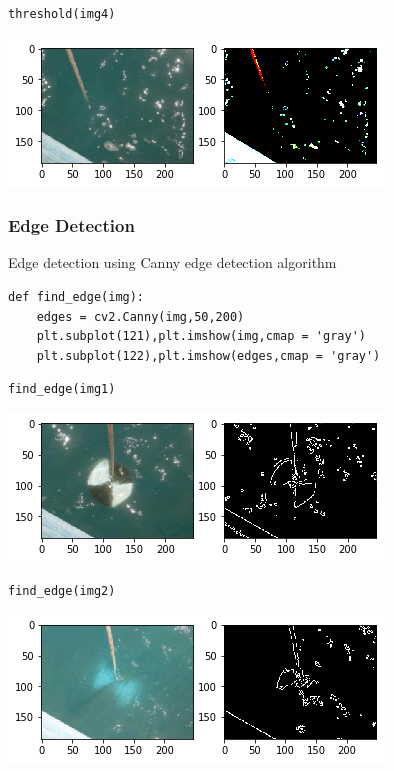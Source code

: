 \begin{verbatim}
threshold(img4)
\end{verbatim}

\includegraphics{secchi-a/output_16_0.png}

\subsubsection{Edge Detection}\label{edge-detection}

Edge detection using Canny edge detection algorithm

\begin{verbatim}
def find_edge(img):
    edges = cv2.Canny(img,50,200)
    plt.subplot(121),plt.imshow(img,cmap = 'gray')
    plt.subplot(122),plt.imshow(edges,cmap = 'gray')
\end{verbatim}

\begin{verbatim}
find_edge(img1)
\end{verbatim}

\includegraphics{secchi-a/output_19_0.png}

\begin{verbatim}
find_edge(img2)
\end{verbatim}

\includegraphics{secchi-a/output_20_0.png}

